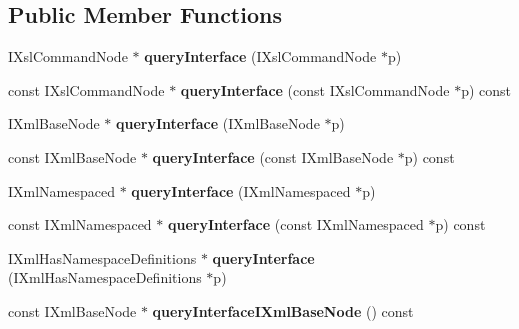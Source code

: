 \subsection*{\-Public \-Member \-Functions}
\begin{DoxyCompactItemize}
\item 
\hypertarget{classgeneral__server_1_1LibXslCommandNode_a48b21a237fbd579da86b0554be37ddd9}{\-I\-Xsl\-Command\-Node $\ast$ {\bfseries query\-Interface} (\-I\-Xsl\-Command\-Node $\ast$p)}\label{classgeneral__server_1_1LibXslCommandNode_a48b21a237fbd579da86b0554be37ddd9}

\item 
\hypertarget{classgeneral__server_1_1LibXslCommandNode_aa2f94e9db347fa372f823dc7da10f426}{const \-I\-Xsl\-Command\-Node $\ast$ {\bfseries query\-Interface} (const \-I\-Xsl\-Command\-Node $\ast$p) const }\label{classgeneral__server_1_1LibXslCommandNode_aa2f94e9db347fa372f823dc7da10f426}

\item 
\hypertarget{classgeneral__server_1_1LibXslCommandNode_a945a51ae367cce3ea779abe6075a076e}{\-I\-Xml\-Base\-Node $\ast$ {\bfseries query\-Interface} (\-I\-Xml\-Base\-Node $\ast$p)}\label{classgeneral__server_1_1LibXslCommandNode_a945a51ae367cce3ea779abe6075a076e}

\item 
\hypertarget{classgeneral__server_1_1LibXslCommandNode_afd11388154939fd951c18a1e5364be9f}{const \-I\-Xml\-Base\-Node $\ast$ {\bfseries query\-Interface} (const \-I\-Xml\-Base\-Node $\ast$p) const }\label{classgeneral__server_1_1LibXslCommandNode_afd11388154939fd951c18a1e5364be9f}

\item 
\hypertarget{classgeneral__server_1_1LibXslCommandNode_aa7b0e22738e4d5aee049ac1819d0f10c}{\-I\-Xml\-Namespaced $\ast$ {\bfseries query\-Interface} (\-I\-Xml\-Namespaced $\ast$p)}\label{classgeneral__server_1_1LibXslCommandNode_aa7b0e22738e4d5aee049ac1819d0f10c}

\item 
\hypertarget{classgeneral__server_1_1LibXslCommandNode_aa73e6ee84ecb17f040bae70ded23cab8}{const \-I\-Xml\-Namespaced $\ast$ {\bfseries query\-Interface} (const \-I\-Xml\-Namespaced $\ast$p) const }\label{classgeneral__server_1_1LibXslCommandNode_aa73e6ee84ecb17f040bae70ded23cab8}

\item 
\hypertarget{classgeneral__server_1_1LibXslCommandNode_a60c184c278b3b9b34d09018a4825154d}{\-I\-Xml\-Has\-Namespace\-Definitions $\ast$ {\bfseries query\-Interface} (\-I\-Xml\-Has\-Namespace\-Definitions $\ast$p)}\label{classgeneral__server_1_1LibXslCommandNode_a60c184c278b3b9b34d09018a4825154d}

\item 
\hypertarget{classgeneral__server_1_1LibXslCommandNode_a303cfde1009e43dd03a58e8a648b7b4a}{const \-I\-Xml\-Base\-Node $\ast$ {\bfseries query\-Interface\-I\-Xml\-Base\-Node} () const }\label{classgeneral__server_1_1LibXslCommandNode_a303cfde1009e43dd03a58e8a648b7b4a}

\end{DoxyCompactItemize}
